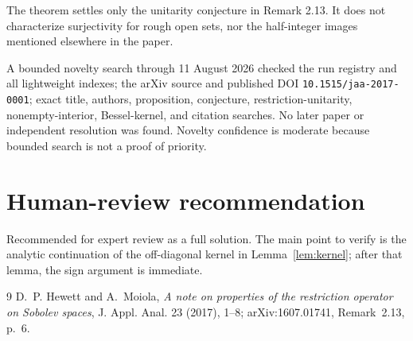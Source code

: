 \documentclass[10pt,a4paper]{article}
\begin{document}
The theorem settles only the unitarity conjecture in Remark 2.13.  It does
not characterize surjectivity for rough open sets, nor the half-integer
images mentioned elsewhere in the paper.

A bounded novelty search through 11 August 2026 checked the run registry and
all lightweight indexes; the arXiv source and published DOI
\texttt{10.1515/jaa-2017-0001}; exact title, authors, proposition, conjecture,
restriction-unitarity, nonempty-interior, Bessel-kernel, and citation
searches.  No later paper or independent resolution was found.  Novelty
confidence is moderate because bounded search is not a proof of priority.

\section{Human-review recommendation}

Recommended for expert review as a full solution.  The main point to verify
is the analytic continuation of the off-diagonal kernel in
Lemma~\ref{lem:kernel}; after that lemma, the sign argument is immediate.

\begin{thebibliography}{9}
D.~P. Hewett and A.~Moiola,
\emph{A note on properties of the restriction operator on Sobolev spaces},
J. Appl. Anal. 23 (2017), 1--8; arXiv:1607.01741,
Remark~2.13, p.~6.
\end{thebibliography}
\end{document}
